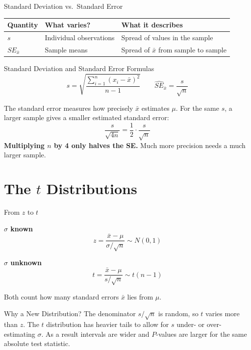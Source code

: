\documentclass[aspectratio=169,10pt]{beamer}
\begin{document}
\begin{frame}{Standard Deviation vs.\ Standard Error}
\begin{center}
\begin{tabularx}{0.88\textwidth}{
>{\centering\arraybackslash}p{}
>{\RaggedRight\arraybackslash}p{}
X}
\toprule
\textbf{Quantity} & \textbf{What varies?} & \textbf{What it describes} \\
\midrule
$s$ & Individual observations & Spread of values in the sample \\[0.15cm]
$SE_{\bar{x}}$ & Sample means & Spread of $\bar{x}$ from sample to sample \\
\bottomrule
\end{tabularx}
\end{center}

\begin{block}{Standard Deviation and Standard Error Formulas}
\centering
$$s=\sqrt{\frac{\sum_{i=1}^{n}(x_i-\bar{x})^2}{n-1}} \qquad \widehat{SE}_{\bar{x}}=\frac{s}{\sqrt{n}}$$
\end{block}

\vspace{0.1cm}
The standard error measures how precisely $\bar{x}$ estimates $\mu$. For the same $s$, a larger sample gives a smaller estimated standard error:
$$\frac{s}{\sqrt{4n}}=\frac{1}{2}\cdot\frac{s}{\sqrt{n}}$$
\textbf{Multiplying $n$ by 4 only halves the SE.} Much more precision needs a much larger sample.
\end{frame}


\section{The $t$ Distributions}

\begin{frame}{From $z$ to $t$}
\begin{center}
\textbf{$\sigma$ known}
$$z=\frac{\bar{x}-\mu}{\sigma/\sqrt{n}}\sim N(0,1)$$

\vspace{0.2cm}

\textbf{$\sigma$ unknown}
$$t=\frac{\bar{x}-\mu}{s/\sqrt{n}}\sim t(n-1)$$
\end{center}

\vspace{0.2cm}
Both count how many standard errors $\bar{x}$ lies from $\mu$.

\vspace{0.2cm}
\begin{block}{Why a New Distribution?}
The denominator $s/\sqrt{n}$ is random, so $t$ varies more than $z$. The $t$ distribution has heavier tails to allow for $s$ under- or over-estimating $\sigma$. As a result intervals are wider and $P$-values are larger for the same absolute test statistic.
\end{block}
\end{frame}
\end{document}
